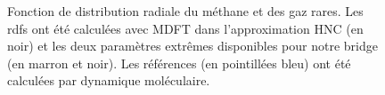 \begin{figure}[H]
\begin{subfigure}{.5\textwidth}
{
    }
  \end{subfigure}
  \caption[Fonction de distribution radiale du méthane et des gaz rares.]{Fonction de distribution radiale du méthane et des gaz rares. Les rdfs ont été calculées avec MDFT dans l'approximation HNC (en noir) et les deux paramètres extrêmes disponibles pour notre bridge (en marron et noir). Les références (en pointillées bleu) ont été calculées par dynamique moléculaire.}
  \label{fig:g_of_r_molecules_modeles}
\end{figure}

